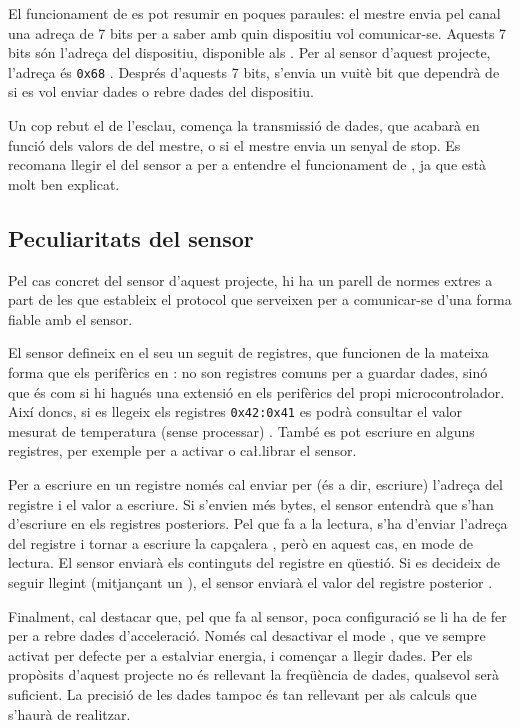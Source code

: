 El funcionament de  es pot resumir en poques paraules: el mestre envia
pel canal una adreça de 7 bits per a saber amb quin dispositiu vol comunicar-se.
Aquests 7 bits són l'adreça del dispositiu, disponible als . Per
al sensor d'aquest projecte, l'adreça és \texttt{0x68} \cite{MPU6050reg}.
Després d'aquests 7 bits,
s'envia un vuitè bit que dependrà de si es vol enviar dades o rebre dades del
dispositiu.

Un cop rebut el  de l'esclau, comença la transmissió de
dades, que acabarà en funció dels valors de  del mestre, o
si el mestre envia un senyal de stop. Es recomana llegir el  del
sensor a \cite{mpu6050specs} per a entendre el funcionament de ,
ja que està molt ben explicat.

\subsection{Peculiaritats del sensor }

Pel cas concret del sensor d'aquest projecte, hi ha un parell de normes extres
a part de les que estableix el protocol  que serveixen per a comunicar-se
d'una forma fiable amb el sensor.

El sensor  defineix en el seu  un seguit de
registres, que funcionen de la mateixa forma que els perifèrics en :
no son registres comuns per a guardar dades, sinó que és com si hi hagués una
extensió en els perifèrics del propi microcontrolador. Així doncs, si es llegeix
els registres \texttt{0x42:0x41} es podrà consultar el valor mesurat de temperatura
(sense processar) \cite{MPU6050reg}. També es pot escriure en alguns registres,
per exemple per a activar o ca\l.librar el sensor.

Per a escriure en un registre només cal enviar per  (és a dir, escriure)
l'adreça del registre i el valor a escriure. Si s'envien més bytes, el sensor
entendrà que s'han d'escriure en els registres posteriors. Pel que fa a la lectura,
s'ha d'enviar l'adreça del registre i tornar a escriure la capçalera ,
però en aquest cas, en mode de lectura. El sensor enviarà els continguts del
registre en qüestió. Si es decideix de seguir llegint (mitjançant un ),
el sensor enviarà el valor del registre posterior \cite{mpu6050specs}.

Finalment, cal destacar que, pel que fa al sensor, poca configuració se li ha de
fer per a rebre dades d'acceleració. Només cal desactivar el mode ,
que ve sempre activat per defecte per a estalviar energia, i començar a llegir
dades. Per els propòsits d'aquest projecte no és rellevant la freqüència de
dades, qualsevol serà suficient. La precisió de les dades tampoc és tan rellevant
per als calculs que s'haurà de realitzar.

